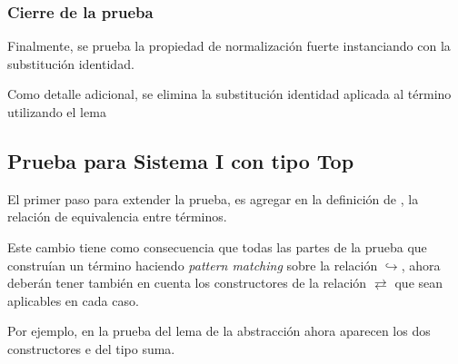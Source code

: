 \subsubsection{Cierre de la prueba}

Finalmente, se prueba la propiedad de normalización fuerte instanciando  con la substitución identidad.

Como detalle adicional, se elimina la substitución identidad aplicada al término utilizando el lema
\AgdaSymbol{:}
\AgdaSymbol{\}}
\AgdaSymbol{\{}
\AgdaSymbol{:}
\AgdaSymbol{\}}


\subsection{Prueba para Sistema I con tipo Top}

El primer paso para extender la prueba, es agregar en la definición de , la relación de equivalencia entre términos.


Este cambio tiene como consecuencia que todas las partes de la prueba que construían un término \snstar haciendo \textit{pattern matching} sobre la relación $\hookrightarrow$, ahora deberán tener también en cuenta los constructores de la relación $\rightleftarrows$ que sean aplicables en cada caso.

\iffalse
Por ejemplo, en la prueba de \func{SN*-rename} ahora aparecen los dos constructores \const{inj₁} y \const{inj₂} del tipo suma.

\ExecuteMetaData[code/strong_norm.tex]{sn-rename}

Para esta prueba es necesario definir un nuevo lema análogo a \func{rename↪}.

\ExecuteMetaData[code/strong_norm.tex]{rename-iso-type}

Una modificación similar se realiza para extender el lema de la abstracción.
\fi

Por ejemplo, en la prueba del lema de la abstracción ahora aparecen los dos constructores  e  del tipo suma.


